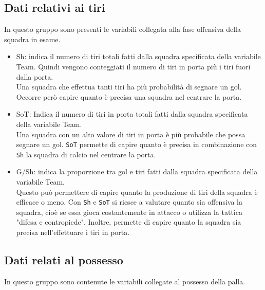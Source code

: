 \subsection{Dati relativi ai tiri}

In questo gruppo sono presenti le variabili collegata alla fase offensiva della squadra in esame.

\begin{itemize}
	
	\item \textsf{Sh}: indica il numero di tiri totali fatti dalla squadra specificata della variabile \textsf{Team}. Quindi vengono conteggiati il numero di tiri in porta più i tiri fuori dalla porta. \\
	Una squadra che effettua tanti tiri ha più probabilità di segnare un gol. Occorre però capire quanto è precisa una squadra nel centrare la porta.
	\item \textsf{SoT}: Indica il numero di tiri in porta totali fatti dalla squadra specificata della variabile \textsf{Team}. \\
	Una squadra con un alto valore di tiri in porta è più probabile che possa segnare un gol. \texttt{SoT} permette di capire quanto è precisa in combinazione con \texttt{Sh} la squadra di calcio nel centrare la porta.
	\item \textsf{G/Sh}: indica la proporzione tra gol e tiri fatti dalla squadra specificata della variabile \textsf{Team}. \\
	Questo può permettere di capire quanto la produzione di tiri della squadra è efficace o meno. Con \texttt{Sh} e \texttt{SoT} si riesce a valutare quanto sia offensiva la squadra, cioè se essa gioca costantemente in attacco o utilizza la tattica "difesa e contropiede". Inoltre, permette di capire quanto la squadra sia precisa nell'effettuare i tiri in porta.
\end{itemize}

\subsection{Dati relati al possesso}

In questo gruppo sono contenute le variabili collegate al possesso della palla. 

